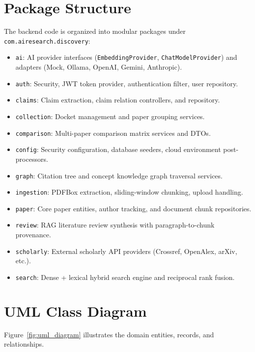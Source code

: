 \documentclass[11pt,a4paper,titlepage]{report}
\begin{document}
\section{Package Structure}
The backend code is organized into modular packages under \texttt{com.airesearch.discovery}:
\begin{itemize}
    \item \texttt{ai}: AI provider interfaces (\texttt{EmbeddingProvider}, \texttt{ChatModelProvider}) and adapters (Mock, Ollama, OpenAI, Gemini, Anthropic).
    \item \texttt{auth}: Security, JWT token provider, authentication filter, user repository.
    \item \texttt{claims}: Claim extraction, claim relation controllers, and repository.
    \item \texttt{collection}: Docket management and paper grouping services.
    \item \texttt{comparison}: Multi-paper comparison matrix services and DTOs.
    \item \texttt{config}: Security configuration, database seeders, cloud environment post-processors.
    \item \texttt{graph}: Citation tree and concept knowledge graph traversal services.
    \item \texttt{ingestion}: PDFBox extraction, sliding-window chunking, upload handling.
    \item \texttt{paper}: Core paper entities, author tracking, and document chunk repositories.
    \item \texttt{review}: RAG literature review synthesis with paragraph-to-chunk provenance.
    \item \texttt{scholarly}: External scholarly API providers (Crossref, OpenAlex, arXiv, etc.).
    \item \texttt{search}: Dense + lexical hybrid search engine and reciprocal rank fusion.
\end{itemize}

\section{UML Class Diagram}
Figure~\ref{fig:uml_diagram} illustrates the domain entities, records, and relationships.
\end{document}
